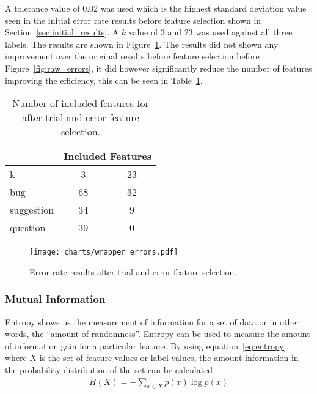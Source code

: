 A tolerance value of 0.02 was used which is the highest standard deviation value seen in the initial error rate results before
feature selection shown in Section~\ref{sec:initial_results}. A $k$ value of 3 and 23 was used against all three labels. The
results are shown in Figure~\ref{fig:trialerror_errors}. The results did not shown any improvement over the original results
before feature selection before Figure~\ref{fig:raw_errors}, it did however significantly reduce the number of features
improving the efficiency, this can be seen in Table~\ref{tbl:trialerror_inc_features}.

\begin{table}[h]
    \centering
    \begin{tabular}{l|c|c}
                   & \multicolumn{2}{l}{Included Features} \\
        \hline
        k          & 3                 & 23                \\
        \hline
        bug        & 68                & 32                \\
        suggestion & 34                & 9                 \\
        question   & 39                & 0                 \\
        \hline
    \end{tabular}
    \caption{Number of included features for after trial and error feature selection.}
    \label{tbl:trialerror_inc_features}
\end{table}

\begin{figure}[h]
    \centering
    \texttt{[image: charts/wrapper\_errors.pdf]}
    \caption{Error rate results after trial and error feature selection.}
    \label{fig:trialerror_errors}
\end{figure}

\subsubsection{Mutual Information}
\label{sec:mutual_informaton}
Entropy shows us the measurement of information for a set of data or in other words, the ``amount of randomness''. Entropy can
be used to measure the amount of information gain for a particular feature. By using equation~\ref{eq:entropy}, where $X$ is
the set of feature values or label values, the amount information in the probability distribution of the set can be calculated.
\begin{align}
    \label{eq:entropy}
    H(X) = -\sum_{x \in X} p(x) \log p(x)
\end{align}

